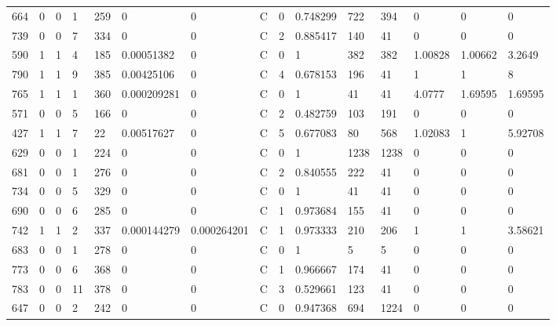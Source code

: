 \begin{latin}
\begin{longtable}{lllllllllllllll}
	664 & 0  & 0   & 1  & 259 & 0              & 0              & C & 0  & 0.748299 & 722  & 394  & 0       & 0       & 0       \\
	739 & 0  & 0   & 7  & 334 & 0              & 0              & C & 2  & 0.885417 & 140  & 41   & 0       & 0       & 0       \\
	590 & 1  & 1   & 4  & 185 & 0.00051382     & 0              & C & 0  & 1        & 382  & 382  & 1.00828 & 1.00662 & 3.2649  \\
	790 & 1  & 1   & 9  & 385 & 0.00425106     & 0              & C & 4  & 0.678153 & 196  & 41   & 1       & 1       & 8       \\
	765 & 1  & 1   & 1  & 360 & 0.000209281    & 0              & C & 0  & 1        & 41   & 41   & 4.0777  & 1.69595 & 1.69595 \\
	571 & 0  & 0   & 5  & 166 & 0              & 0              & C & 2  & 0.482759 & 103  & 191  & 0       & 0       & 0       \\
	427 & 1  & 1   & 7  & 22  & 0.00517627     & 0              & C & 5  & 0.677083 & 80   & 568  & 1.02083 & 1       & 5.92708 \\
	629 & 0  & 0   & 1  & 224 & 0              & 0              & C & 0  & 1        & 1238 & 1238 & 0       & 0       & 0       \\
	681 & 0  & 0   & 1  & 276 & 0              & 0              & C & 2  & 0.840555 & 222  & 41   & 0       & 0       & 0       \\
	734 & 0  & 0   & 5  & 329 & 0              & 0              & C & 0  & 1        & 41   & 41   & 0       & 0       & 0       \\
	690 & 0  & 0   & 6  & 285 & 0              & 0              & C & 1  & 0.973684 & 155  & 41   & 0       & 0       & 0       \\
	742 & 1  & 1   & 2  & 337 & 0.000144279    & 0.000264201    & C & 1  & 0.973333 & 210  & 206  & 1       & 1       & 3.58621 \\
	683 & 0  & 0   & 1  & 278 & 0              & 0              & C & 0  & 1        & 5    & 5    & 0       & 0       & 0       \\
	773 & 0  & 0   & 6  & 368 & 0              & 0              & C & 1  & 0.966667 & 174  & 41   & 0       & 0       & 0       \\
	783 & 0  & 0   & 11 & 378 & 0              & 0              & C & 3  & 0.529661 & 123  & 41   & 0       & 0       & 0       \\
	647 & 0  & 0   & 2  & 242 & 0              & 0              & C & 0  & 0.947368 & 694  & 1224 & 0       & 0       & 0       \\

\end{longtable}
\end{latin}
